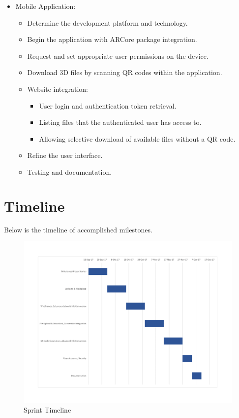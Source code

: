 \begin{itemize}
		\item Mobile Application:
		\begin{itemize}
			\item Determine the development platform and technology.
			\item Begin the application with ARCore package integration.
			\item Request and set appropriate user permissions on the device.
			\item Download 3D files by scanning QR codes within the application.
			\item Website integration:
			\begin{itemize}
				\item User login and authentication token retrieval.
				\item Listing files that the authenticated user has access to.
				\item Allowing selective download of available files without a QR code.
			\end{itemize}
			\item Refine the user interface.
			\item Testing and documentation.
		\end{itemize}
	\end{itemize}

\section{Timeline}
Below is the timeline of accomplished milestones.

\begin{figure}[H]
\begin{center}
\includegraphics[width=1\textwidth]{./SprintGanattChart}
\end{center}
\caption{Sprint Timeline}
\end{figure}
